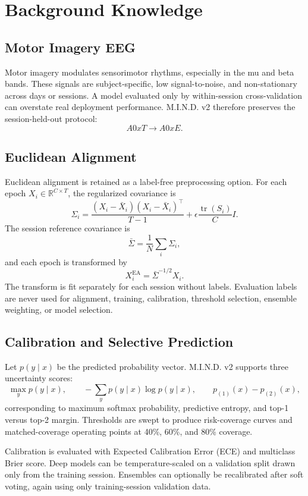 \documentclass[11pt]{article}
\begin{document}
\section{Background Knowledge}

\subsection{Motor Imagery EEG}

Motor imagery modulates sensorimotor rhythms, especially in the mu and beta
bands. These signals are subject-specific, low signal-to-noise, and
non-stationary across days or sessions. A model evaluated only by
within-session cross-validation can overstate real deployment performance.
M.I.N.D. v2 therefore preserves the session-held-out protocol:
\[
  A0xT \rightarrow A0xE.
\]

\subsection{Euclidean Alignment}

Euclidean alignment is retained as a label-free preprocessing option. For each
epoch \(X_i \in \mathbb{R}^{C \times T}\), the regularized covariance is
\[
  \Sigma_i =
  \frac{(X_i - \bar{X}_i)(X_i - \bar{X}_i)^\top}{T - 1}
  + \epsilon \frac{\operatorname{tr}(S_i)}{C}I.
\]
The session reference covariance is
\[
  \bar{\Sigma} = \frac{1}{N}\sum_i \Sigma_i,
\]
and each epoch is transformed by
\[
  X_i^{\mathrm{EA}} = \bar{\Sigma}^{-1/2}X_i.
\]
The transform is fit separately for each session without labels. Evaluation
labels are never used for alignment, training, calibration, threshold
selection, ensemble weighting, or model selection.

\subsection{Calibration and Selective Prediction}

Let \(p(y \mid x)\) be the predicted probability vector. M.I.N.D. v2 supports
three uncertainty scores:
\[
  \max_y p(y \mid x), \qquad
  -\sum_y p(y \mid x)\log p(y \mid x), \qquad
  p_{(1)}(x) - p_{(2)}(x),
\]
corresponding to maximum softmax probability, predictive entropy, and top-1
versus top-2 margin. Thresholds are swept to produce risk-coverage curves and
matched-coverage operating points at 40\%, 60\%, and 80\% coverage.

Calibration is evaluated with Expected Calibration Error (ECE) and multiclass
Brier score. Deep models can be temperature-scaled on a validation split drawn
only from the training session. Ensembles can optionally be recalibrated after
soft voting, again using only training-session validation data.
\end{document}
